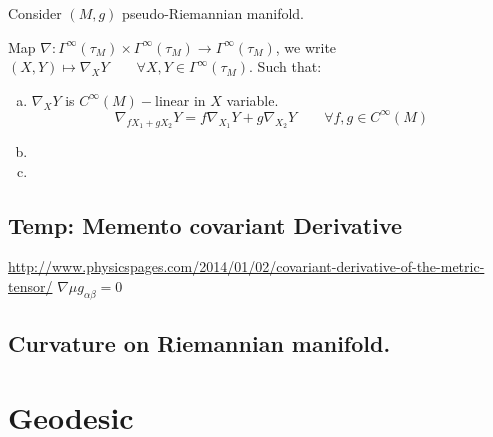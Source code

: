 \documentclass[a4paper,12pt]{scrartcl}    %
\begin{document}
Consider $(M,g)$ pseudo-Riemannian manifold.

\begin{definition}
 Map $\nabla : \Gamma^\infty(\tau_M) \times \Gamma^\infty(\tau_M) \rightarrow \Gamma^\infty(\tau_M)$,
 we write $(X,Y)\mapsto \nabla_X Y \qquad \forall X,Y \in \Gamma^\infty(\tau_M)$.
 Such that:
 \begin{enumerate}[(a)]
  \item $\nabla_X Y $ is $C^\infty(M)-$linear in $X$ variable.
   \begin{displaymath}
   \nabla_{f X_1 + g X_2}Y = f\nabla_{X_1} Y + g \nabla_{X_2} Y \qquad \forall f,g \in C^\infty(M)
   \end{displaymath}
 
  \item
  
  \item
 
 \end{enumerate}


\end{definition}

\subsection{Temp: Memento covariant Derivative}
\url{http://www.physicspages.com/2014/01/02/covariant-derivative-of-the-metric-tensor/}
$\nabla\mu g_{\alpha \beta} = 0$

\subsection{Curvature on Riemannian manifold.}
\newpage
\section{Geodesic}
\end{document}
